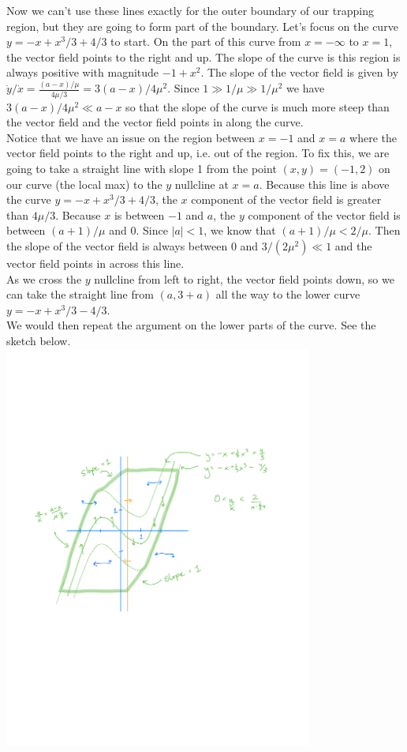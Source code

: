 \documentclass[12pt,letterpaper,answers]{exam}
\begin{document}
\begin{questions}
\begin{parts}
\begin{solution}
Now we can't use these lines exactly for the outer boundary of our trapping region, but they are going to form part of the boundary.  Let's focus on the curve $y=-x+x^3/3+4/3$ to start. On the part of this curve from $x=-\infty$ to $x=1$, the vector field points to the right and up.  The slope of the curve is this region is always positive with magnitude $-1+x^2$.  The slope of the vector field is given by $\dot y/\dot x=\frac{(a-x)/\mu}{4\mu/3}=3(a-x)/4\mu^2$. Since $1\gg 1/\mu\gg1/\mu^2$ we have $3(a-x)/4\mu^2\ll a-x$ so that the slope of the curve is much more steep than the vector field and the vector field points in along the curve. \\

Notice that we have an issue on the region between $x=-1$ and $x=a$ where the vector field points to the right and up, i.e. out of the region.  To fix this, we are going to take a straight line with slope 1 from the point $(x,y)=(-1,2)$ on our curve (the local max) to the $y$ nullcline at $x=a$.  Because this line is above the curve $y=-x+x^3/3+4/3$, the $x$ component of the vector field is greater than $4\mu/3$.  Because $x$ is between $-1$ and $a$, the $y$ component of the vector field is between $(a+1)/\mu$ and $0$. Since $|a|<1$, we know that $(a+1)/\mu<2/\mu$.  Then the slope of the vector field is always between $0$ and $3/(2\mu^2)\ll 1$ and the vector field points in across this line.\\

As we cross the $y$ nullcline from left to right, the vector field points down, so we can take the straight line from $(a,3+a)$ all the way to the lower curve $y=-x+x^3/3-4/3$.\\

We would then repeat the argument on the lower parts of the curve.  See the sketch below.\\

\includegraphics[width=4in]{img/H-07-3c}


\end{solution}
\end{parts}
\end{questions}
\end{document}
